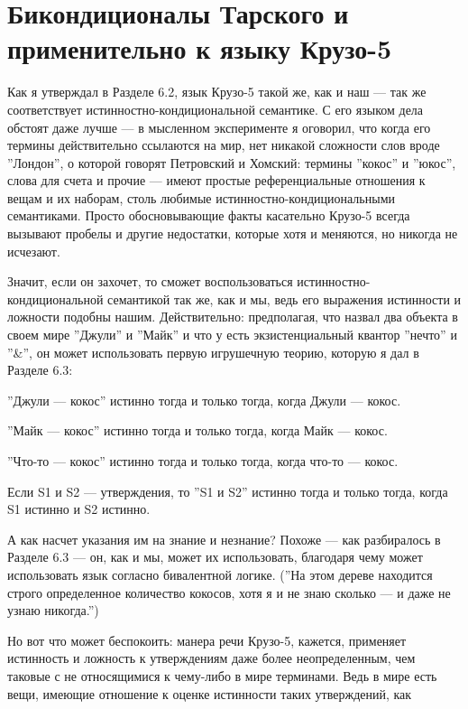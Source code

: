 \documentclass[11pt]{book}
\begin{document}
\section{Бикондиционалы Тарского и применительно к языку Крузо-5}

Как я утверждал в Разделе 6.2, язык Крузо-5 такой же, как и наш --- так же соответствует истинностно-кондициональной семантике. С его языком дела обстоят даже лучше --- в мысленном эксперименте я оговорил, что когда его термины действительно ссылаются на мир, нет никакой сложности слов вроде ''Лондон'', о которой говорят Петровский и Хомский: термины ''кокос'' и ''юкос'', слова для счета и прочие --- имеют простые референциальные отношения к вещам и их наборам, столь любимые истинностно-кондициональными семантиками. Просто обосновывающие факты касательно Крузо-5 всегда вызывают пробелы и другие недостатки, которые хотя и меняются, но никогда не исчезают.

Значит, если он захочет, то сможет воспользоваться истинностно-кондициональной семантикой так же, как и мы, ведь его выражения истинности и ложности подобны нашим. Действительно: предполагая, что назвал два объекта в своем мире ''Джули'' и ''Майк'' и что у есть экзистенциальный квантор ''нечто'' и ''&'', он может использовать первую игрушечную теорию, которую я дал в Разделе 6.3:

\smallskip

''Джули --- кокос'' истинно тогда и только тогда, когда Джули --- кокос.

''Майк --- кокос'' истинно тогда и только тогда, когда Майк --- кокос.

''Что-то --- кокос'' истинно тогда и только тогда, когда что-то --- кокос.

Если S1 и S2 --- утверждения, то ''S1 и S2'' истинно тогда и только тогда, когда S1 истинно и S2 истинно.

\smallskip

А как насчет указания им на знание и незнание? Похоже --- как разбиралось в Разделе 6.3 --- он, как и мы, может их использовать, благодаря чему может использовать язык согласно бивалентной логике. (''На этом дереве находится строго определенное количество кокосов, хотя я и не знаю сколько --- и даже не узнаю никогда.'')

Но вот что может беспокоить: манера речи Крузо-5, кажется, применяет истинность и ложность к утверждениям даже более неопределенным, чем таковые с не относящимися к чему-либо в мире терминами. Ведь в мире есть вещи, имеющие отношение к оценке истинности таких утверждений, как
\end{document}
